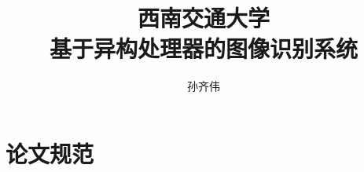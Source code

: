 \documentclass[bachelor]{swjtuthesis}
\title{西南交通大学\\基于异构处理器的图像识别系统}
\author{孙齐伟}
\begin{document}
\maketitle

%

\frontmatter

\tableofcontents
\listoffigures
\listoftables
% 


\mainmatter








% 
% 
% 

\appendix

\chapter{论文规范}



\backmatter


\end{document}
